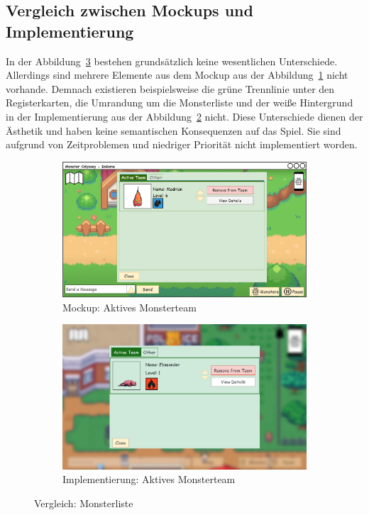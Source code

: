 \subsection{Vergleich zwischen Mockups und Implementierung}\label{subsec:vergleich-zwischen-mockups-und-implementierung-monster-team}
In der Abbildung~\ref{fig: Vergleich: Monsterliste} bestehen grundsätzlich keine wesentlichen Unterschiede. Allerdings sind mehrere Elemente aus dem Mockup aus der Abbildung~\ref{fig: Mockup: Aktives Monsterteam} nicht vorhande. Demnach existieren beispielsweise die grüne Trennlinie unter den Registerkarten, die Umrandung um die Monsterliste und der weiße Hintergrund in der Implementierung aus der Abbildung~\ref{fig: Implementierung: Aktives Monsterteam} nicht. Diese Unterschiede dienen der Ästhetik und haben keine semantischen Konsequenzen auf das Spiel. Sie sind aufgrund von Zeitproblemen und niedriger Priorität nicht implementiert worden.
\begin{figure}[H]
    \centering
    \begin{subfigure}[b]{0.4\textwidth}
        \includegraphics[width=\textwidth]{images/mockups/Monster/IngameMonsterMonsterActiveWithoutFlamurtle.png}
        \caption{Mockup: Aktives Monsterteam \phantom{aaa}}
        \label{fig: Mockup: Aktives Monsterteam}
    \end{subfigure}
    \hfill
    \begin{subfigure}[b]{0.4\textwidth}
        \includegraphics[width=\textwidth]{images/implementation/Monster/Monsterteam Active.png}
        \caption{Implementierung: Aktives Monsterteam}
        \label{fig: Implementierung: Aktives Monsterteam}
    \end{subfigure}
    \caption{Vergleich: Monsterliste}
    \label{fig: Vergleich: Monsterliste}
\end{figure}
